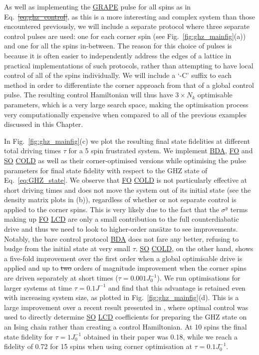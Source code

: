 \documentclass[a4paper,oneside,11pt]{book}
\newcommand{\sy}{\sigma^y}
\newcommand{\acrref}[1]{\hyperref[acr:#1]{#1}}
\providecommand{\DIFaddtex}[1]{{\protect\color{blue}\uwave{#1}}} %
\providecommand{\DIFdeltex}[1]{{\protect\color{red}\sout{#1}}}                      %
\providecommand{\DIFaddbegin}{} %
\providecommand{\DIFaddend}{} %
\providecommand{\DIFdelbegin}{} %
\providecommand{\DIFdelend}{} %
\providecommand{\DIFadd}[1]{\texorpdfstring{\DIFaddtex{#1}}{#1}} %
\providecommand{\DIFdel}[1]{\texorpdfstring{\DIFdeltex{#1}}{}} %
\newcommand{\DIFscaledelfig}{0.5}
\newlength{\DIFdelgraphicswidth} %
\newlength{\DIFdelgraphicsheight} %
\newcommand{\DIFaddincludegraphics}[2][]{{\color{blue}\fbox{\DIFOincludegraphics[#1]{#2}}}} %
\newcommand{\DIFdelincludegraphics}[2][]{%
\sbox{\DIFdelgraphicsbox}{\DIFOincludegraphics[#1]{#2}}%
\settoboxwidth{\DIFdelgraphicswidth}{\DIFdelgraphicsbox} %
\settoboxtotalheight{\DIFdelgraphicsheight}{\DIFdelgraphicsbox} %
\scalebox{\DIFscaledelfig}{%
\parbox[b]{\DIFdelgraphicswidth}{\usebox{\DIFdelgraphicsbox}\\[-\baselineskip] \rule{\DIFdelgraphicswidth}{0em}}\llap{\resizebox{\DIFdelgraphicswidth}{\DIFdelgraphicsheight}{%
\setlength{\unitlength}{\DIFdelgraphicswidth}%
\begin{picture}(1,1)%
\thicklines\linethickness{2pt} %
{\color[rgb]{1,0,0}\put(0,0){\framebox(1,1){}}}%
{\color[rgb]{1,0,0}\put(0,0){\line( 1,1){1}}}%
{\color[rgb]{1,0,0}\put(0,1){\line(1,-1){1}}}%
\end{picture}%
}\hspace*{3pt}}} %
} %
\DeclareRobustCommand{\DIFaddbegin}{\DIFOaddbegin \let\includegraphics\DIFaddincludegraphics} %
\DeclareRobustCommand{\DIFaddend}{\DIFOaddend \let\includegraphics\DIFOincludegraphics} %
\DeclareRobustCommand{\DIFdelbegin}{\DIFOdelbegin \let\includegraphics\DIFdelincludegraphics} %
\DeclareRobustCommand{\DIFdelend}{\DIFOaddend \let\includegraphics\DIFOincludegraphics} %
\begin{document}
As well as implementing the \acrref{GRAPE} pulse for all spins as in Eq.~\DIFdelbegin \DIFdel{\ref{eq:ghz_control}}\DIFdelend \DIFaddbegin \DIFadd{\eqref{eq:ghz_control}}\DIFaddend , as this is a more interesting and complex system than those encountered previously, we will include a separate protocol where three separate control pulses are used: one for each corner spin (see Fig.~\ref{fig:ghz_mainfig}(a)) and one for all the spins in-between. The reason for this choice of pulses is because it is often easier to independently address the edges of a lattice in practical implementations of such protocols, rather than attempting to have local control of all of the spins individually. We will include a `-C' suffix to each method in order to differentiate the corner approach from that of a global control pulse. The resulting control Hamiltonian will thus have $3 \times N_k$ optimisable parameters, which is a very large search space, making the optimisation process very computationally expensive when compared to all of the previous examples discussed in this Chapter. 

In Fig.~\ref{fig:ghz_mainfig}(c) we plot the resulting final state fidelities at different total driving times $\tau$ for a 5 spin frustrated system. We implement \acrref{BDA}, \acrref{FO} and \acrref{SO} \acrref{COLD} as well as their corner-optimised versions while optimising the pulse parameters for final state fidelity with respect to the GHZ state of Eq.~\eqref{eq:GHZ_state}. We observe that \acrref{FO} \acrref{COLD} is not particularly effective at short driving times and does not move the system out of its initial state (see the density matrix plots in (b)), regardless of whether or not separate control is applied to the corner spins. This is very likely due to the fact that the $\sy$ terms making up \acrref{FO} \acrref{LCD} are only a small contribution to the full counterdiabatic drive and thus we need to look to higher-order ans\"{a}tze to see improvements. Notably, the bare control protocol \acrref{BDA} does not fare any better, refusing to budge from the initial state at very small $\tau$. \acrref{SO} \acrref{COLD}, on the other hand, shows a five-fold improvement over the first order when a global optimisable drive is applied and up to \DIFdelbegin \DIFdel{two }\DIFdelend \DIFaddbegin \DIFadd{a further two more }\DIFaddend orders of magnitude improvement when the corner spins are driven separately at short times ($\tau = 0.001J_0^{-1}$).  We run optimisations for larger systems at time $\tau = 0.1J^{-1}$ and find that this advantage is retained even with increasing system size, as plotted in Fig.~\ref{fig:ghz_mainfig}(d). This is a large improvement over a recent result presented in \cite{sun_optimizing_2022}, where optimal control was used to directly determine \acrref{SO} \acrref{LCD} coefficients for preparing the GHZ state on an Ising chain rather than creating a control Hamiltonian. At 10 spins the final state fidelity for $\tau = 1J_0^{-1}$ obtained in their paper was 0.18, while we reach a fidelity of 0.72 for 15 spins when using corner optimisation at $\tau = 0.1J_0^{-1}$. 
\end{document}
